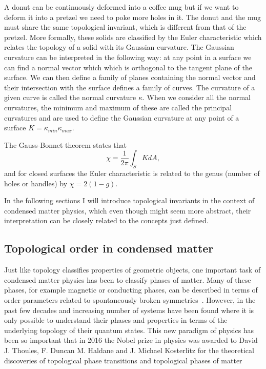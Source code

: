 A donut can be continuously deformed into a coffee mug but if we want to deform it into a pretzel we need to poke more holes in it. The donut and the mug must share the same topological invariant, which is different from that of the pretzel. More formally, these solids are classified by the Euler characteristic which relates the topology of a solid with its Gaussian curvature. The Gaussian curvature can be interpreted in the following way: at any point in a surface we can find a normal vector which which is orthogonal to the tangent plane of the surface. We can then define a family of planes containing the normal vector and their intersection with the surface defines a family of curves. The curvature of a given curve is called the normal curvature $\kappa$. When we consider all the normal curvatures, the minimum and maximum of these are called the principal curvatures and are used to define the Gaussian curvature at any point of a surface $K=\kappa_{min}\kappa_{max}$. 

The Gauss-Bonnet theorem states that
%
\begin{equation}
	\chi = \frac{1}{2\pi}\int_S K dA,
	\label{eq:euler_characteristic}
\end{equation}
%
and for closed surfaces the Euler characteristic is related to the genus (number of holes or handles) by $\chi=2(1-g)$. 

In the following sections I will introduce topological invariants in the context of condensed matter physics, which even though might seem more abstract, their interpretation can be closely related to the concepts just defined.

\subsection{Topological order in condensed matter}

Just like topology classifies properties of geometric objects, one important task of condensed matter physics has been to classify phases of matter. Many of these phases, for example magnetic or conducting phases, can be described in terms of order parameters related to spontaneously broken symmetries~\cite{landau_theory_1936}. However, in the past few decades and increasing number of systems have been found where it is only possible to understand their phases and properties in terms of the underlying topology of their quantum states. This new paradigm of physics has been so important that in 2016 the Nobel prize in physics was awarded to David J. Thoules, F. Duncan M. Haldane and J. Michael Kosterlitz for the theoretical discoveries of topological phase transitions and topological phases of matter 

